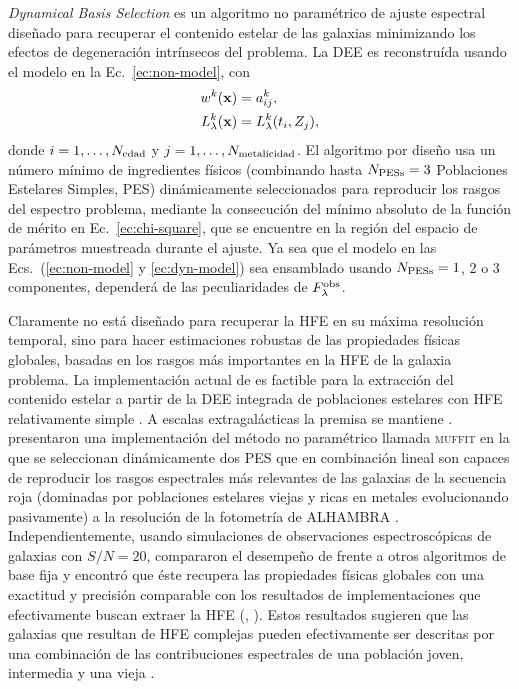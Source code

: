 \emph{Dynamical Basis Selection} \citep[\dynbas;][]{Mateu2009, Mateu2010, Magris2015} es un
algoritmo no paramétrico de ajuste espectral diseñado para recuperar el contenido estelar de las
galaxias minimizando los efectos de degeneración intrínsecos del problema. La DEE es reconstruída
usando el modelo en la Ec.~\eqref{ec:non-model}, con
%
\begin{subequations}\label{ec:dyn-model}
\begin{align}
w^k(\hip) &= a_{ij}^k, \\
\sedi{k}(\hip) &= \sedi{k}(t_i, Z_j),
\end{align}
\end{subequations}
%
donde $i=1,\ldots,\Nt{edad}$ y $j=1,\ldots,\Nt{metalicidad}$. El algoritmo \dynbas por diseño usa un
número mínimo de ingredientes físicos (combinando hasta $\Nt{PESs}=3$ Poblaciones Estelares Simples,
PES) dinámicamente seleccionados para reproducir los rasgos del espectro problema, mediante la
consecución del mínimo absoluto de la función de mérito en Ec.~\eqref{ec:chi-square}, que se
encuentre en la región del espacio de parámetros muestreada durante el ajuste. Ya sea que el modelo
en las Ecs.~(\ref{ec:non-model} y \ref{ec:dyn-model}) sea ensamblado usando $\Nt{PESs}=1$, $2$ o $3$
componentes, dependerá de las peculiaridades de $\sedt[F]{obs}$.

Claramente \dynbas no está diseñado para recuperar la HFE en su máxima resolución temporal, sino
para hacer estimaciones robustas de las propiedades físicas globales, basadas en los rasgos más
importantes en la HFE de la galaxia problema. La implementación actual de \dynbas es factible para
la extracción del contenido estelar a partir de la DEE integrada de poblaciones estelares con HFE
relativamente simple \citep{Cabrera-Ziri2016}. A escalas extragalácticas la premisa se mantiene
\citep[\eg,][]{Diaz2015, Mejia-Narvaez2017}. \citet{Diaz2015} presentaron una implementación del
método no paramétrico llamada \textsc{muffit} en la que se seleccionan dinámicamente dos PES que en
combinación lineal son capaces de reproducir los rasgos espectrales más relevantes de las galaxias
de la secuencia roja (dominadas por poblaciones estelares viejas y ricas en metales evolucionando
pasivamente) a la resolución de la fotometría de ALHAMBRA \citep{Moles2008}. Independientemente,
usando simulaciones de observaciones espectroscópicas de galaxias con $S/N=20$, \citet{Magris2015}
compararon el desempeño de \dynbas frente a otros algoritmos de base fija y encontró que éste
recupera las propiedades físicas globales con una exactitud y precisión comparable con los
resultados de implementaciones que efectivamente buscan extraer la HFE (\eg, \starlight). Estos
resultados sugieren que las galaxias que resultan de HFE complejas pueden efectivamente ser
descritas por una combinación de las contribuciones espectrales de una población joven, intermedia y
una vieja \citep{CidFernandes2005}.

